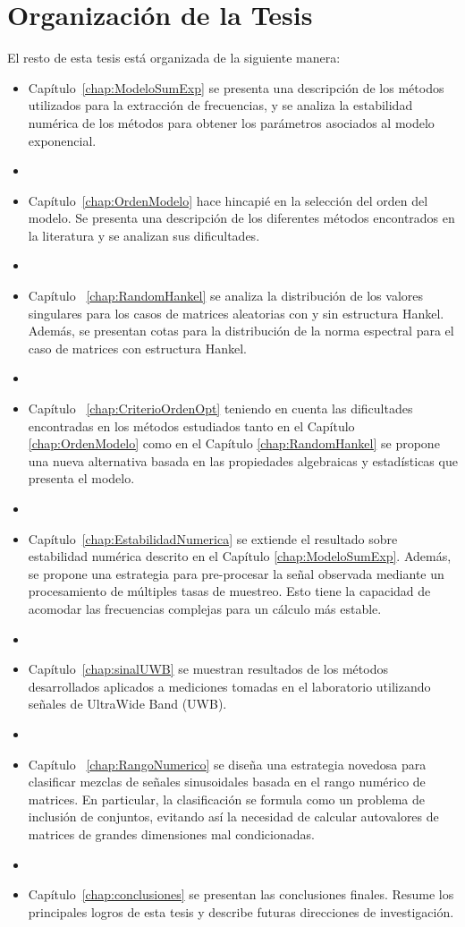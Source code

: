 \section{Organización de la Tesis}


El resto de esta tesis está organizada de la siguiente manera:

\begin{itemize}
	\item Capítulo~\ref{chap:ModeloSumExp} se presenta una descripción de los métodos utilizados para la extracción de frecuencias, y se analiza la estabilidad numérica de los métodos para obtener los parámetros asociados al modelo exponencial. 
	\item[] 
	\item Capítulo~\ref{chap:OrdenModelo} hace hincapié en la selección del orden del modelo. Se presenta una descripción de los diferentes métodos encontrados en la literatura y se analizan sus dificultades. 
	\item[] 
    \item Capítulo ~\ref{chap:RandomHankel} se analiza la distribución de los valores singulares para los casos de matrices aleatorias con y sin estructura Hankel. Además, se presentan cotas para la distribución de la norma espectral para el caso de matrices con estructura Hankel. 
    \item[]
	\item Capítulo ~\ref{chap:CriterioOrdenOpt} teniendo en cuenta las dificultades encontradas en los métodos estudiados tanto en el Capítulo \ref{chap:OrdenModelo} como en el Capítulo \ref{chap:RandomHankel} se propone una nueva alternativa basada en las propiedades algebraicas y estadísticas que presenta el modelo.
	\item[] 
	\item Capítulo~\ref{chap:EstabilidadNumerica} se extiende el resultado sobre estabilidad numérica descrito en el Capítulo \ref{chap:ModeloSumExp}. Además, se propone una estrategia para pre-procesar la señal observada mediante un procesamiento de múltiples tasas de muestreo. Esto tiene la capacidad de acomodar las frecuencias complejas para un cálculo más estable.
	\item[] 
	\item Capítulo~\ref{chap:sinalUWB} se muestran resultados de los métodos desarrollados aplicados a mediciones tomadas en el laboratorio utilizando señales de UltraWide Band (UWB).
	\item[] 
	\item Capítulo ~\ref{chap:RangoNumerico} se diseña una estrategia novedosa para clasificar mezclas de señales sinusoidales basada en el rango numérico de matrices. En particular, la clasificación se formula como un problema de inclusión de conjuntos, evitando así la necesidad de calcular autovalores de matrices de grandes dimensiones mal condicionadas.
	\item[]
	\item Capítulo~\ref{chap:conclusiones} se presentan las conclusiones finales. Resume los principales logros de esta tesis y describe futuras direcciones de investigación.
\end{itemize}

